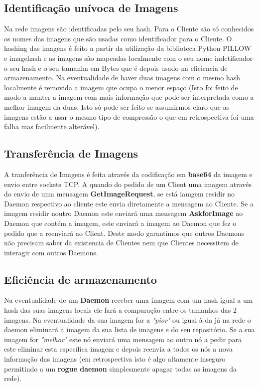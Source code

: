 \documentclass[12pt, letterpaper, twoside]{article}
\begin{document}
	\subsection{Identificação unívoca de Imagens}
	Na rede imagens são identificadas pelo seu hash. Para o Cliente são só conhecidos os nomes das imagens que são usadas como identificador para o Cliente. O hashing das imagens é feito a partir da utilização da biblioteca Python PILLOW e imagehash e as imagens são mapeadas localmente com o seu nome indetificador o seu hash e o seu tamanha em Bytes que é depois usado na eficiencia de armazenamento. Na eventualidade de haver duas imagens com o mesmo hash localmente é removida a imagem que ocupa o menor espaço (Isto foi feito de modo a manter a imagem com mais informação que pode ser interpretada como a melhor imagem da duas. Isto só pode ser feito se assumirmos claro que as imagens estão a usar o mesmo tipo de compressão o que em retrospectiva foi uma falha mas facilmente alterável).


	
	\subsection{Transferência de Imagens}
	
	A tranferência de Imagens é feita através da codificação em \textbf{base64} da imagem e envio entre sockets TCP. A quando do pedido de um Client uma imagem através do envio de uma mensagem \textbf{GetImageRequest}, se está iamgem residir no Daemon respectivo ao cliente este envia diretamente a mensagem ao Cliente. Se a imagem residir noutro Daemon este enviará uma mensagem \textbf{AskforImage} ao Daemon que contém a imagem, este enviará a imagem ao Daemon que fez o pedido que a reenviará ao Client. Deste modo garantimos que outros Daemons não precisam saber da existencia de Clientes nem que Clientes necessitem de interagir com outros Daemons.  
	
	\subsection{Eficiência de armazenamento}
	
	Na eventualidade de um \textbf{Daemon} receber uma imagem com um hash igual a um hash das suas imagens locais ele fará a comparação entre os tamanhos das 2 imagens. Na eventualidade da sua imagem for a \textit{"pior"} ou igual à da já na rede o daemon eliminará a imagem da sua lista de imagens e do seu repositório. Se a sua imagem for \textit{"melhor"} este nó enviará uma mensagem ao outro nó a pedir para este eliminar esta específica imagem e depois reenvia a todos os nós a nova informação das imagens (em retrospectiva isto é algo altamente inseguro permitindo a um \textbf{rogue daemon} simplesmente apagar todas as imagens da rede).
	
\end{document}
